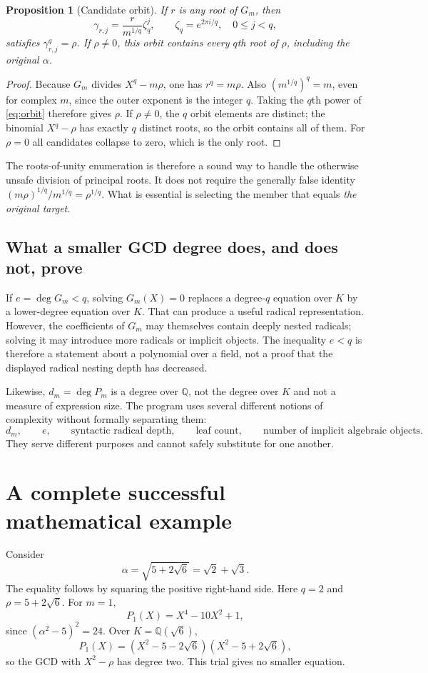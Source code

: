 \documentclass[11pt,letterpaper]{article}
\newcommand{\code}[1]{\texttt{\detokenize{#1}}}
\newcommand{\Q}{\mathbb{Q}}
\newtheorem{proposition}{Proposition}[section]
\theoremstyle{definition}
\begin{document}
\begin{proposition}[Candidate orbit]
If $r$ is any root of $G_m$, then
\begin{equation}
  \gamma_{r,j}=\frac{r}{m^{1/q}}\zeta_q^j,
  \qquad \zeta_q=e^{2\pi i/q},\quad 0\le j<q,
  \label{eq:orbit}
\end{equation}
satisfies $\gamma_{r,j}^q=\rho$. If $\rho\ne0$, this orbit contains every $q$th root
of $\rho$, including the original $\alpha$.
\end{proposition}
\begin{proof}
Because $G_m$ divides $X^q-m\rho$, one has $r^q=m\rho$. Also
$(m^{1/q})^q=m$, even for complex $m$, since the outer exponent is the integer $q$.
Taking the $q$th power of \eqref{eq:orbit} therefore gives $\rho$. If $\rho\ne0$,
the $q$ orbit elements are distinct; the binomial $X^q-\rho$ has exactly $q$
distinct roots, so the orbit contains all of them. For $\rho=0$ all candidates
collapse to zero, which is the only root.
\end{proof}
The roots-of-unity enumeration is therefore a sound way to handle the otherwise
unsafe division of principal roots. It does not require the generally false
identity $(m\rho)^{1/q}/m^{1/q}=\rho^{1/q}$.
What is essential is selecting the member that equals \emph{the original target}.

\subsection{What a smaller GCD degree does, and does not, prove}
If $e=\deg G_m<q$, solving $G_m(X)=0$ replaces a degree-$q$ equation over $K$ by a
lower-degree equation over $K$. That can produce a useful radical representation.
However, the coefficients of $G_m$ may themselves contain deeply nested radicals;
solving it may introduce more radicals or implicit \code{Root} objects. The
inequality $e<q$ is therefore a statement about a polynomial over a field, not a
proof that the displayed radical nesting depth has decreased.

Likewise, $d_m=\deg P_m$ is a degree over $\Q$, not the degree over $K$ and not a
measure of expression size. The program uses several different notions of
complexity without formally separating them:
\[
  d_m,\qquad e,\qquad \text{syntactic radical depth},\qquad
  \text{leaf count},\qquad \text{number of implicit algebraic objects}.
\]
They serve different purposes and cannot safely substitute for one another.

\section{A complete successful mathematical example}
\label{sec:worked}
Consider
\begin{equation}
  \alpha=\sqrt{5+2\sqrt6}=\sqrt2+\sqrt3.
  \label{eq:classic}
\end{equation}
The equality follows by squaring the positive right-hand side. Here $q=2$ and
$\rho=5+2\sqrt6$. For $m=1$,
\[
 P_1(X)=X^4-10X^2+1,
\]
since $(\alpha^2-5)^2=24$. Over $K=\Q(\sqrt6)$,
\[
 P_1(X)=(X^2-5-2\sqrt6)(X^2-5+2\sqrt6),
\]
so the GCD with $X^2-\rho$ has degree two. This trial gives no smaller equation.
\end{document}
